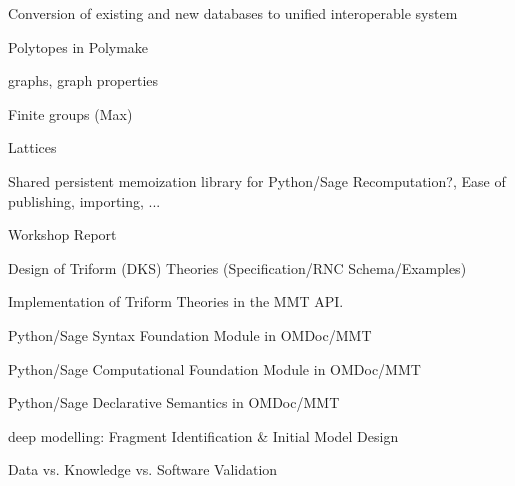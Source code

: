 \begin{workpackage}[id=dksbases,wphases=1-48!.5,
  title=Data/Knowledge/Software-Bases,lead=JU,
  ZHRM=12,JURM=36,USHRM=12,UWRM=3,SARM=9]
\begin{wpdelivs}
  \begin{wpdeliv}[due=12,id=conv,dissem=PU,nature=DEC]
        {Conversion of existing and new databases to unified interoperable system}
     \begin{compactitem}
     \item Polytopes in Polymake
     \item graphs, graph properties
     \item Finite groups (Max)
     \item Lattices
     \end{compactitem}
   \end{wpdeliv}
  \begin{wpdeliv}[due=24,id=persistent-memoization,dissem=PU,nature=O]
    {Shared persistent memoization library for Python/Sage} 
    Recomputation?,  Ease of publishing, importing, ...
  \end{wpdeliv}
  \begin{wpdeliv}[due=9,id=wsrep,dissem=PU,nature=R]{Workshop Report}
  \end{wpdeliv}
  \begin{wpdeliv}[due=12,id=dkstheories,dissem=PU,nature=R]
        {Design of Triform (DKS) Theories (Specification/RNC Schema/Examples)}
  \end{wpdeliv}
  \begin{wpdeliv}[due=24,id=dksimp,dissem=PU,nature=O]
        {Implementation of Triform Theories in the MMT API.}
  \end{wpdeliv}
  \begin{wpdeliv}[due=12,id=pssyntax,dissem=PU,nature=DEC]
        {Python/Sage Syntax Foundation Module in OMDoc/MMT}
  \end{wpdeliv}
  \begin{wpdeliv}[due=24,id=psfoundation,dissem=PU,nature=O]
        {Python/Sage Computational Foundation Module in OMDoc/MMT}
  \end{wpdeliv}
  \begin{wpdeliv}[due=36,id=pssem,dissem=PU,nature=O]
      {Python/Sage Declarative Semantics in OMDoc/MMT}
  \end{wpdeliv}
  \begin{wpdeliv}[due=12,id=lfmmod,dissem=PU,nature=R]
      {\LMFDB deep modelling: Fragment Identification \& Initial Model Design}
  \end{wpdeliv}
  \begin{wpdeliv}[due=18,id=lfmval,dissem=PU,nature=R]
      {\LMFDB Data vs. Knowledge vs. Software Validation}

\end{wpdeliv}
\end{wpdelivs}
\end{workpackage}
